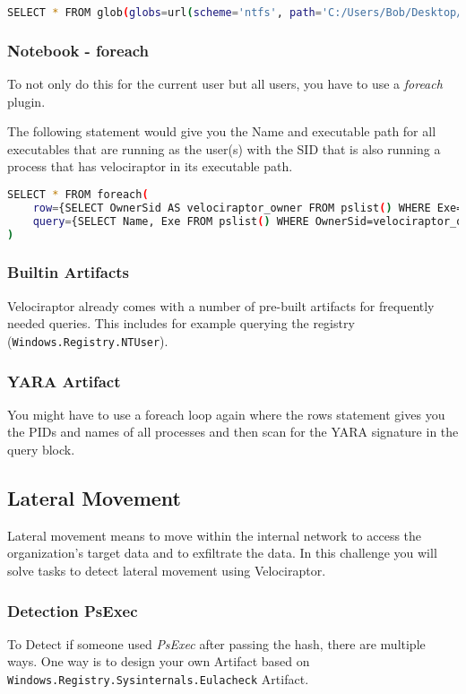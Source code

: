 \begin{lstlisting}[language=bash]
    SELECT * FROM glob(globs=url(scheme='ntfs', path='C:/Users/Bob/Desktop/images.zip', fragment='/**/*.jpg').String, accessor='zip')
\end{lstlisting}

\subsubsection{Notebook - foreach}
To not only do this for the current user but all users, you have to use a \textit{foreach} plugin.

The following statement would give you the Name and executable path for all executables that are running as the user(s) with the SID that is also running a process that has velociraptor in its executable path.

\begin{lstlisting}[language=bash]
    SELECT * FROM foreach(
    row={SELECT OwnerSid AS velociraptor_owner FROM pslist() WHERE Exe=~'velociraptor'},
    query={SELECT Name, Exe FROM pslist() WHERE OwnerSid=velociraptor_owner}
)
\end{lstlisting}

\subsubsection{Builtin Artifacts}
Velociraptor already comes with a number of pre-built artifacts for frequently needed queries.
This includes for example querying the registry (\lstinline|Windows.Registry.NTUser|).

\subsubsection{YARA Artifact}
You might have to use a foreach loop again where the rows statement gives you the PIDs and names of all processes and then scan for the YARA signature in the query block.

\newpage

\subsection{Lateral Movement}
Lateral movement means to move within the internal network to access the organization's target data and to exfiltrate the data. In this challenge you will solve tasks to detect lateral movement using Velociraptor.

\subsubsection{Detection PsExec}
To Detect if someone used \textit{PsExec} after passing the hash, there are multiple ways. One way is to design your own Artifact based on \lstinline|Windows.Registry.Sysinternals.Eulacheck| Artifact.

